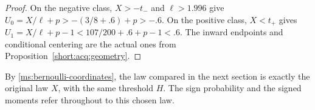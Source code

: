 \begin{proof}
On the negative class, $X>-t_-$ and $\ell>1.996$ give
$U_0=X/\ell+p>-(3/8+.6)+p>-.6$. On the positive class,
$X<t_+$ gives
$U_1=X/\ell+p-1<107/200+.6+p-1<.6$.
The inward endpoints and conditional centering are the actual ones from
Proposition~\ref{short:acq:geometry}.
\end{proof}

By \eqref{ms:bernoulli-coordinates}, the law compared in the next
section is exactly the original law $X$, with the same threshold $H$.
The sign probability and the signed moments refer throughout to this
chosen law.
